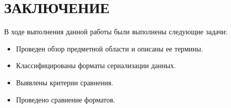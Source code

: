 \chapter*{ЗАКЛЮЧЕНИЕ}

В ходе выполнения данной работы были выполнены следующие задачи:
\begin{itemize}
\item Проведен обзор предметной области и описаны ее термины.
\item Классифицированы форматы сериализации данных.
\item Выявлены критерии сравнения.
\item Проведено сравнение форматов.
\end{itemize}
 
 